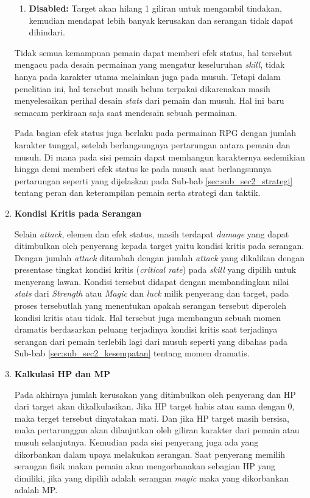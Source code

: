 \begin{enumerate}[label=\textbf{\arabic*).}]
\begin{enumerate}[label=\alph*).]
		\item \textbf{Disabled:} Target akan hilang 1 giliran untuk mengambil tindakan, kemudian mendapat lebih banyak kerusakan dan serangan tidak dapat dihindari.
	\end{enumerate}
	
	Tidak semua kemampuan pemain dapat memberi efek status, hal tersebut mengacu pada desain permainan yang mengatur keseluruhan \textit{skill}, tidak hanya pada karakter utama melainkan juga pada musuh. Tetapi dalam penelitian ini, hal tersebut masih belum terpakai dikarenakan masih menyelesaikan perihal desain \textit{stats} dari pemain dan musuh. Hal ini baru semacam perkiraan saja saat mendesain sebuah permainan.
	\vspace{1ex}
	
	Pada bagian efek status juga berlaku pada permainan RPG dengan jumlah karakter tunggal, setelah berlangsungnya pertarungan antara pemain dan musuh. Di mana pada sisi pemain dapat memhangun karakternya sedemikian hingga demi memberi efek status ke pada musuh saat berlangsunnya pertarungan seperti yang dijelaskan pada Sub-bab \ref{sec:sub_sec2_strategi} tentang peran dan keterampilan pemain serta strategi dan taktik.
	
	\item \textbf{Kondisi Kritis pada Serangan}
	
	Selain \textit{attack}, elemen dan efek status, masih terdapat \textit{damage} yang dapat ditimbulkan oleh penyerang kepada target yaitu kondisi kritis pada serangan. Dengan jumlah \textit{attack} ditambah dengan jumlah \textit{attack} yang dikalikan dengan presentase tingkat kondisi kritis (\textit{critical rate}) pada \textit{skill} yang dipilih untuk menyerang lawan. Kondisi tersebut didapat dengan membandingkan nilai \textit{stats} dari \textit{Strength} atau \textit{Magic} dan \textit{luck} milik penyerang dan target, pada proses tersebutlah yang menentukan apakah serangan tersebut diperoleh kondisi kritis atau tidak. Hal tersebut juga membangun sebuah momen dramatis berdasarkan peluang terjadinya kondisi kritis saat terjadinya serangan dari pemain terlebih lagi dari musuh seperti yang dibahas pada Sub-bab \ref{sec:sub_sec2_kesempatan} tentang momen dramatis.
	
	\item \textbf{Kalkulasi HP dan MP}
	
	Pada akhirnya jumlah kerusakan yang ditimbulkan oleh penyerang dan HP dari target akan dikalkulasikan. Jika HP target habis atau sama dengan 0, maka terget tersebut dinyatakan mati. Dan jika HP target masih bersisa, maka pertarunggan akan dilanjutkan oleh giliran karakter dari pemain atau musuh selanjutnya. Kemudian pada sisi penyerang juga ada yang dikorbankan dalam upaya melakukan serangan. Saat penyerang memilih serangan fisik makan pemain akan mengorbanakan sebagian HP yang dimiliki, jika yang dipilih adalah serangan \textit{magic} maka yang dikorbankan adalah MP.
\end{enumerate}


